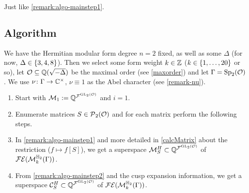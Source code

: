 \begin{remark}
\label{remark:algo-mainstep2}
Just like \cref{remark:algo-mainstep1}.
\end{remark}

\subsection{Algorithm}

\begin{algo}
\label{main-algo}
We have the Hermitian modular form degree $n = 2$ fixed, as well as some $\Delta$ (for now, $\Delta \in \Set{3,4,8}$). Then we select some form weight $k \in \mathbb{Z}$ ($k \in \Set{1,\dots,20}$ or so), let $\mathcal{O} \subseteq \mathbb{Q}(\sqrt{-\Delta})$ be the maximal order (see \cref{maxorder}) and let $\Gamma = \operatorname{Sp}_2(\mathcal{O})$. We use $\nu \colon \Gamma \rightarrow \mathbb{C}^\times$, $\nu \equiv 1$ as the Abel character (see \cref{remark-nu}).

\begin{enumerate}
\item
Start with $\mathcal{M}_1 := \mathbb{Q}^{{\mathcal{F}}^{\operatorname{GL}_2(\mathcal{O})}}$ and $i=1$.

\item\label{NextSStep} Enumerate matrices $S \in \operatorname{\mathcal{P}}_2(\mathcal{O})$ and for each matrix perform the following steps.


\item
In \cref{remark:algo-mainstep1} and more detailed in \cref{calcMatrix} about the restriction ($f \mapsto f[S]$), we get a superspace $\mathcal{M}^H_S \subset \mathbb{Q}^{{\mathcal{F}}^{\operatorname{GL}_2(\mathcal{O})}}$ of $\mathcal{FE}(\operatorname{\mathcal{M}}^{\mathbb{H}_{2}}_{k} (\Gamma))$.

\item
From \cref{remark:algo-mainstep2} and the cusp expansion information, we get a superspace $\mathcal{C}^H_S \subset \mathbb{Q}^{{\mathcal{F}}^{\operatorname{GL}_2(\mathcal{O})}}$ of $\mathcal{FE}(\operatorname{\mathcal{M}}^{\mathbb{H}_{2}}_{k} (\Gamma))$.


\end{enumerate}
\end{algo}
